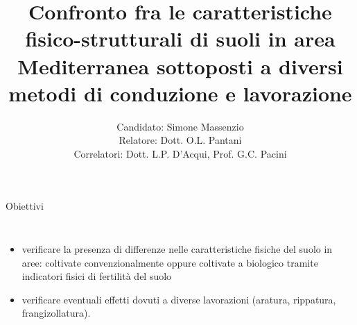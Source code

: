\documentclass[10pt]{beamer}
\title[Tesi di laurea magistrale Simone Massenzio ] %
{ Confronto fra le caratteristiche
  fisico-strutturali di suoli in area
  Mediterranea sottoposti a diversi metodi di
  conduzione e lavorazione}
\author[Simone Massenzio]{ 
  Candidato: Simone Massenzio \\
  Relatore: Dott. O.L. Pantani\\
  \vspace{0.1cm}
  Correlatori:
  Dott. L.P. D'Acqui, Prof. G.C. Pacini}
\institute[] { \emph{Dipartimento di Scienze della Produzioni Animali e
    dell'Ambiente\\
    Universit\`a degli studi di Firenze - UniFI\\}
  
}
\date{\displaydate{date}}
\begin{document}
{\1
  \begin{frame}[noframenumbering]%
    \titlepage
  \end{frame}}







\begin{frame}{Obiettivi}{}
  \begin{columns}[c]
    \begin{itemize}[<+->]
      \pause
    \item verificare la presenza di differenze nelle caratteristiche
      fisiche del suolo in aree: coltivate convenzionalmente oppure
      coltivate a biologico tramite indicatori fisici di fertilità del
      suolo
    \item verificare eventuali effetti dovuti a diverse lavorazioni
      (aratura, rippatura, frangizollatura).
    \end{itemize}
  \end{columns}
\end{frame}
\end{document}
